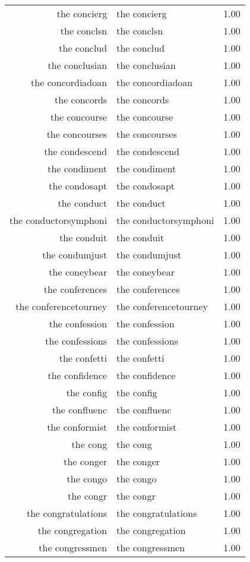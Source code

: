 \begin{table}[ht]
\begin{tabular}{rlr}
  the concierg & the concierg & 1.00 \\ 
  the conclsn & the conclsn & 1.00 \\ 
  the conclud & the conclud & 1.00 \\ 
  the conclusian & the conclusian & 1.00 \\ 
  the concordiadoan & the concordiadoan & 1.00 \\ 
  the concords & the concords & 1.00 \\ 
  the concourse & the concourse & 1.00 \\ 
  the concourses & the concourses & 1.00 \\ 
  the condescend & the condescend & 1.00 \\ 
  the condiment & the condiment & 1.00 \\ 
  the condosapt & the condosapt & 1.00 \\ 
  the conduct & the conduct & 1.00 \\ 
  the conductorsymphoni & the conductorsymphoni & 1.00 \\ 
  the conduit & the conduit & 1.00 \\ 
  the condumjust & the condumjust & 1.00 \\ 
  the coneybear & the coneybear & 1.00 \\ 
  the conferences & the conferences & 1.00 \\ 
  the conferencetourney & the conferencetourney & 1.00 \\ 
  the confession & the confession & 1.00 \\ 
  the confessions & the confessions & 1.00 \\ 
  the confetti & the confetti & 1.00 \\ 
  the confidence & the confidence & 1.00 \\ 
  the config & the config & 1.00 \\ 
  the confluenc & the confluenc & 1.00 \\ 
  the conformist & the conformist & 1.00 \\ 
  the cong & the cong & 1.00 \\ 
  the conger & the conger & 1.00 \\ 
  the congo & the congo & 1.00 \\ 
  the congr & the congr & 1.00 \\ 
  the congratulations & the congratulations & 1.00 \\ 
  the congregation & the congregation & 1.00 \\ 
  the congressmen & the congressmen & 1.00 \\ 

\end{tabular}
\end{table}
